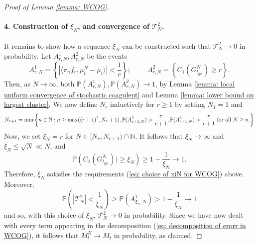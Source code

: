 \begin{proof}[Proof of Lemma \ref{lemma: WCOG}]
       \paragraph{4. Construction of $\xi_N$, and convergence of $\mathcal{T}^2_N$.} It remains to show how a sequence $\xi_N$ can be constructed such that $\mathcal{T}^2_N \rightarrow 0$ in probability. Let $A^1_{r,N}, A^2_{r,N}$ be the events \begin{equation} \label{eq: definition of A1rn for WCOG}
       A^1_{r,N}=\left\{ |\langle \pi_n f_r, \mu^N_t-\mu_t\rangle|<\frac{1}{r}\right\}; \hspace{1cm}
       A^2_{r,N}=\left\{C_1(G^N_{t_\text{gel}}) \geq r\right\}.
   \end{equation} Then, as $N\rightarrow \infty$, both $\mathbb{P}(A^1_{r,N}), \mathbb{P}(A^2_{r,N}) \rightarrow 1$, by Lemma \ref{lemma: local uniform convergence of stochastic coagulent} and Lemma \ref{lemma: lower bound on largest cluster}. We now define $N_r$ inductively for $r\geq 1$ by setting $N_1=1$ and \begin{equation}
       \label{eq: recursive definition of Nr for WCOG} N_{r+1}=\min\left\{n \in \mathbb{N}: n\geq \max((r+1)^2, N_r+1),  \mathbb{P}(A^2_{r+1,N})>\frac{r}{r+1},  \mathbb{P}(A^3_{r+1,N})>\frac{r}{r+1} \hspace{0.1cm} \text{for all }N\geq n. \right\}
   \end{equation} Now, we set $\xi_N=r$ for $N\in [N_r, N_{r+1})\cap\mathbb{N}.$ It follows that $\xi_N \rightarrow \infty$ and $\xi_N\leq \sqrt{N}\ll N$, and \begin{equation}
       \mathbb{P}\left(C_1(G^N_{t_\text{gel}}))\geq \xi_N\right)\ge 1-\frac{1}{\xi_N} \rightarrow 1. 
   \end{equation} Therefore, $\xi_N$ satisfies the requirements (\ref{eq: choice of xiN for WCOG}) above. Moreover, \begin{equation}
       \mathbb{P}\left(|\mathcal{T}^2_N| <\frac{1}{\xi_N}\right) \ge \mathbb{P}\left(A^1_{\xi_N,N}\right) > 1-\frac{1}{\xi_N}\rightarrow 1
   \end{equation} and so, with this choice of $\xi_N$, $\mathcal{T}^2_N \rightarrow 0$ in probability. Since we have now dealt with every term appearing in the decomposition (\ref{eq: decomposition of erorr in WCOG}), it follows that $M^N_t\rightarrow M_t$ in probability, as claimed. \end{proof} 